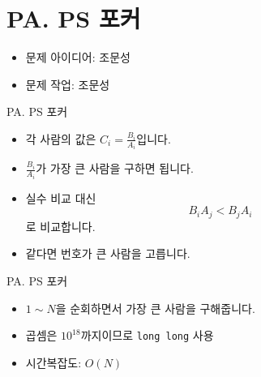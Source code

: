 \def\probno{PA}
\def\probtitle{PS 포커}

\section{\probno{}. \probtitle{}}

\begin{frame} %
    \sectiontitle{\probno{}}{\probtitle{}}
    \begin{itemize}
        \item 문제 아이디어: 조문성
        \item 문제 작업: 조문성
    \end{itemize}
\end{frame}

\begin{frame}{\probno{}. \probtitle{}}
    \begin{itemize}
        \item 각 사람의 값은 $C_i = \frac{B_i}{A_i}$입니다.
        \item $\frac{B_i}{A_i}$가 가장 큰 사람을 구하면 됩니다.
        \item 실수 비교 대신
        \[
            B_i A_j < B_j A_i
        \]
        로 비교합니다.
        \item 같다면 번호가 큰 사람을 고릅니다.
    \end{itemize}
\end{frame}

\begin{frame}{\probno{}. \probtitle{}}
    \begin{itemize}
        \item $1 \sim N$을 순회하면서 가장 큰 사람을 구해줍니다.
        \item 곱셈은 $10^{18}$까지이므로 \texttt{long long} 사용
        \item 시간복잡도: $O(N)$
    \end{itemize}
\end{frame}
